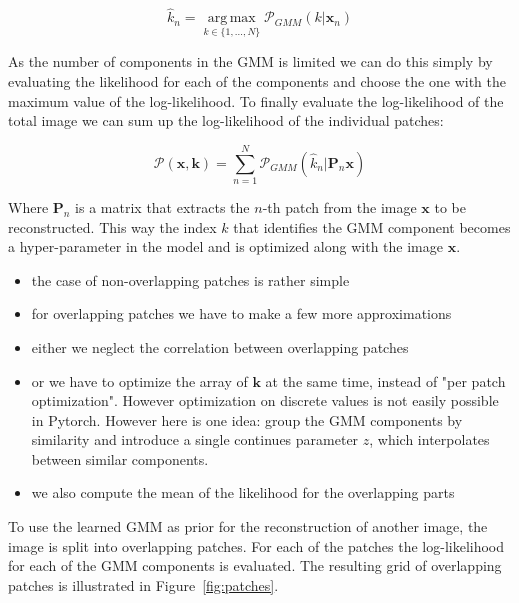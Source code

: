 \documentclass[twocolumn]{aastex631}
\DeclareMathOperator*{\argmax}{arg\,max}
\begin{document}
    \begin{equation}
        \hat{k}_n = \underset{k \in \{1, ..., N\} }{\argmax}{\mathcal{P}_{GMM}(k| \mathbf{x}_n)}
    \end{equation}
    \vspace{0.2em}

    As the number of components in the GMM is limited we can do this simply by evaluating the likelihood for each of the components and choose the one with
    the maximum value of the log-likelihood. To finally evaluate the log-likelihood
    of the total image we can sum up the log-likelihood of the individual patches: 

    \begin{equation}
        \mathcal{P}(\mathbf{x}, \mathbf{k}) = \sum_{n = 1}^N \mathcal{P}_{GMM}(\hat{k}_n | \mathbf{P}_n \mathbf{x})
    \end{equation}

    Where $\mathbf{P}_n$ is a matrix that extracts the $n$-th patch
    from the image $\mathbf{x}$ to be reconstructed. This way the index $k$ that identifies the GMM component becomes a hyper-parameter in the model and is optimized along with the image $\mathbf{x}$.
    
    \begin{itemize}
        \item the case of non-overlapping patches is rather simple
        \item for overlapping patches we have to make a few more approximations
        \item either we neglect the correlation between overlapping patches
        \item or we have to optimize the array of $\mathbf{k}$ at the same time, instead of "per patch optimization". However optimization on discrete 
        values is not easily possible in Pytorch. However here is one idea:
        group the GMM components by similarity and introduce a single continues
        parameter $z$, which interpolates between similar components. 
        \item we also compute the mean of the likelihood for the overlapping parts
    \end{itemize}

    To use the learned GMM as prior for the reconstruction of another image, the image is split into overlapping patches. For each of the patches the log-likelihood for each of the GMM components is evaluated. The resulting grid of overlapping patches is illustrated in Figure~\ref{fig:patches}.
\end{document}
